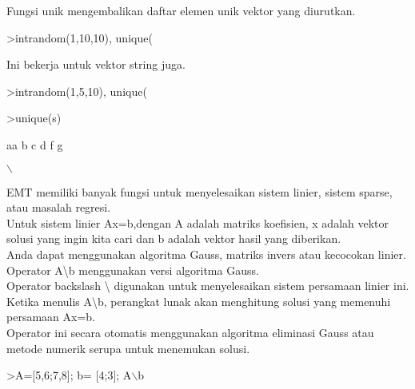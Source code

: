 \documentclass[a4paper,10pt]{article}
\begin{document}
\begin{eulernotebook}
\begin{eulercomment}
\begin{eulercomment}
\begin{eulercomment}
\begin{eulercomment}
\begin{euleroutput}
\end{euleroutput}
\begin{eulercomment}
Fungsi unik mengembalikan daftar elemen unik vektor yang diurutkan.
\end{eulercomment}
\begin{eulerprompt}
>intrandom(1,10,10), unique(%
\end{eulerprompt}
\begin{euleroutput}
  [6,  5,  9,  1,  6,  4,  4,  5,  9,  6]
  [1,  4,  5,  6,  9]
\end{euleroutput}
\begin{eulercomment}
Ini bekerja untuk vektor string juga.
\end{eulercomment}
\begin{eulerprompt}
>intrandom(1,5,10), unique(%
\end{eulerprompt}
\begin{euleroutput}
  [3,  1,  4,  3,  10]
  [1,  3,  4,  10]
\end{euleroutput}
\begin{eulerprompt}
>unique(s)
\end{eulerprompt}
\begin{euleroutput}
  aa
  b
  c
  d
  f
  g
\end{euleroutput}
\begin{euleroutput}
  \(\backslash\)
\end{euleroutput}
\begin{eulercomment}
EMT memiliki banyak fungsi untuk menyelesaikan sistem linier, sistem
sparse, atau masalah regresi.\\
Untuk sistem linier Ax=b,dengan A adalah matriks koefisien, x adalah
vektor solusi yang ingin kita cari dan b adalah vektor hasil yang
diberikan.\\
Anda dapat menggunakan algoritma Gauss, matriks invers atau kecocokan
linier.\\
Operator A\textbackslash{}b menggunakan versi algoritma Gauss.\\
Operator backslash \textbackslash{} digunakan untuk menyelesaikan sistem persamaan
linier ini. Ketika menulis A\textbackslash{}b, perangkat lunak akan menghitung solusi
yang memenuhi persamaan Ax=b.\\
Operator ini secara otomatis menggunakan algoritma eliminasi Gauss
atau metode numerik serupa untuk menemukan solusi.
\end{eulercomment}
\begin{eulerprompt}
>A=[5,6;7,8]; b= [4;3]; A\(\backslash\)b

\end{eulerprompt}
\end{eulercomment}
\end{eulercomment}
\end{eulercomment}
\end{eulercomment}
\end{eulernotebook}
\end{document}
